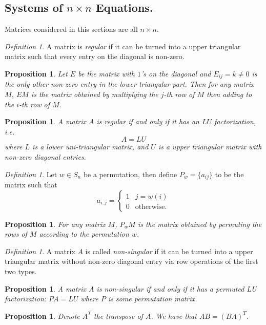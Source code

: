 \documentclass[12pt]{amsart}
\newtheorem{proposition}[theorem]{Proposition}
\theoremstyle{remark}
\newtheorem{definition}[theorem]{Definition}
\numberwithin{equation}{section}
\begin{document}
\subsection{Systems of $n\times n$ Equations.}
Matrices considered in this sections are all $n\times n$.
\begin{definition}
	A matrix is \emph{regular} if it can be turned into a upper triangular matrix such that every entry on the diagonal is non-zero.
\end{definition}
\begin{proposition}
	Let $E$ be the matrix with $1$'s on the diagonal and $E_{ij}=k\neq 0$ is the only other non-zero entry in the lower triangular part. Then for any matrix $M$, $EM$ is the matrix obtained by multiplying the $j$-th row of $M$ then adding to the $i$-th row of $M$.
\end{proposition}

\begin{proposition}
	A matrix $A$ is regular if and only if it has an $LU$ factorization, i.e.
	\[A=LU\]
	where $L$ is a lower uni-triangular matrix, and $U$ is a upper triangular matrix with non-zero diagonal entries.
\end{proposition}

\begin{definition}
	Let $w\in S_n$ be a permutation, then define $P_w=\{a_{ij}\}$ to be the matrix such that $$a_{i,j}=\begin{cases}
		1&j=w(i) \\ 0&  \text{otherwise.}
	\end{cases}$$
\end{definition}

\begin{proposition}
	For any matrix $M$, $P_wM$ is the matrix obtained by permuting the rows of $M$ according to the permutation $w$.
\end{proposition}

\begin{definition}
	A matrix $A$ is called \emph{non-singular} if it can be turned into a upper triangular matrix without non-zero diagonal entry via row operations of the first two types.
\end{definition}
\begin{proposition}
	A matrix $A$ is non-singular if and only if it has a permuted LU factorization:
	$PA=LU$ where $P$ is some permutation matrix.
\end{proposition}
\begin{proposition}
	Denote $A^T$ the transpose of $A$. We have that $AB = (BA)^T$.
\end{proposition}
\end{document}
